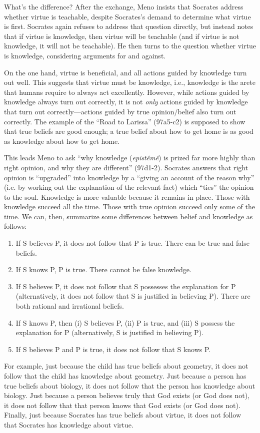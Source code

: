 \documentclass[10 pt]{article}
\begin{document}
What's the difference? After the exchange, Meno insists that Socrates address whether virtue is teachable, despite Socrates's demand to determine what virtue is first. Socrates again refuses to address that question directly, but instead notes that if virtue is knowledge, then virtue will be teachable (and if virtue is not knowledge, it will not be teachable). He then turns to the question whether virtue is knowledge, considering arguments for and against. 

On the one hand, virtue is beneficial, and all actions guided by knowledge turn out well. This suggests that virtue must be knowledge, i.e., knowledge is the arete that humans require to always act excellently. However, while actions guided by knowledge always turn out correctly, it is not \emph{only} actions guided by knowledge that turn out correctly---actions guided by true opinion/belief also turn out correctly.  The example of the ``Road to Larissa'' (97a5-c2) is supposed to show that true beliefs are good enough; a true belief about how to get home is as good as knowledge about how to get home.

This leads Meno to ask ``why knowledge (\emph{epist\^{e}m\^{e}}) is prized far more highly than right opinion, and why they are different'' (97d1-2). Socrates answers that right opinion is ``upgraded'' into knowledge by a ``giving an account of the reason why'' (i.e. by working out the explanation of the relevant fact) which ``ties'' the opinion to the soul. Knowledge is more valuable because it remains in place. Those with knowledge succeed all the time. Those with true opinion succeed only some of the time. We can, then, summarize some differences between belief and knowledge as follows:

\begin{enumerate}
\item If S believes P, it does not follow that P is true. There can be true and false beliefs. 
\item If S knows P, P is true. There cannot be false knowledge.
\item If S believes P, it does not follow that S possesses the explanation for P (alternatively, it does not follow that S is justified in believing P). There are both rational and irrational beliefs.
\item If S knows P, then (i) S believes P, (ii) P is true, and (iii) S possess the explanation for P (alternatively, S is justified in believing P). 
\item If S believes P and P is true, it does not follow that S knows P.  
\end{enumerate}

For example, just because the child has true beliefs about geometry, it does not follow that the child has knowledge about geometry. Just because a person has true beliefs about biology, it does not follow that the person has knowledge about biology. Just because a person believes truly that God exists (or God does not), it does not follow that that person knows that God exists (or God does not). Finally, just because Socrates has true beliefs about virtue, it does not follow that Socrates has knowledge about virtue. 

 
\end{document}
